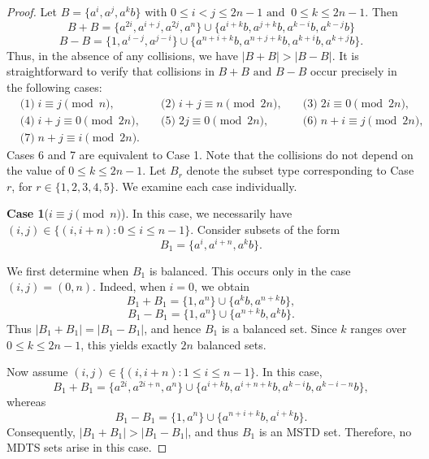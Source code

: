 \documentclass[10pt,a4paper]{amsart}
\begin{document}
\begin{proof}
Let $B=\{a^i,a^j,a^kb\}$ with $0\leq i<j\leq 2n-1 \text{ and }~0\leq k\leq 2n-1$. Then 
$$B+B=\{a^{2i},a^{i+j},a^{2j},a^n\}\cup\{a^{i+k}b,a^{j+k}b,a^{k-i}b,a^{k-j}b\}$$  
$$B-B=\{1,a^{i-j},a^{j-i}\}\cup \{a^{n+i+k}b,a^{n+j+k}b,a^{k+i}b,a^{k+j}b\}.$$ 
Thus, in the absence of any collisions, we have $|B+B|>|B-B|$.
It is straightforward to verify that collisions in $B+B \text{ and }B-B$ occur precisely in the following cases:
\begin{align*}
&\text{(1)}\; i \equiv j \pmod{n}, \quad
&\text{(2)}\; i+j \equiv n \pmod{2n}, \quad
&\text{(3)}\; 2i \equiv 0 \pmod{2n},\\
&\text{(4)}\; i+j \equiv 0 \pmod{2n}, \quad
&\text{(5)}\; 2j \equiv 0 \pmod{2n}, \quad
&\text{(6)}\; n+i \equiv j \pmod{2n},\\
&\text{(7)}\; n+j \equiv i \pmod{2n}.
\end{align*}
Cases 6 and 7 are equivalent to Case 1. Note that the collisions do not depend on the value of $0\leq k\leq 2n-1$. Let $B_{r}$ denote the subset type corresponding to Case $r$, for $r\in \{1,2,3,4,5\}$.   We examine each case individually.\par
\textbf{Case 1}($i \equiv j \pmod n$).
In this case, we necessarily have $(i,j)\in \{(i,i+n): 0\leq i\leq n-1\}$. Consider subsets of the form
$$B_1=\{a^{i},a^{i+n},a^{k}b\}.$$

We first determine when $B_1$ is balanced. This occurs only in the case $(i,j)=(0,n)$. Indeed, when $i=0$, we obtain
$$B_1+B_1=\{1,a^{n}\}\cup\{a^{k}b,a^{n+k}b\},$$
$$B_1-B_1=\{1,a^{n}\}\cup\{a^{n+k}b,a^{k}b\}.$$
Thus $|B_1+B_1|=|B_1-B_1|$, and hence $B_1$ is a balanced set. Since $k$ ranges over $0\le k\le 2n-1$, this yields exactly $2n$ balanced sets.

Now assume $(i,j)\in \{(i,i+n): 1\leq i\leq n-1\}$. In this case,
$$B_1+B_1=\{a^{2i},a^{2i+n},a^{n}\}\cup\{a^{i+k}b,a^{i+n+k}b,a^{k-i}b,a^{k-i-n}b\},$$
whereas
$$B_1-B_1=\{1,a^{n}\}\cup\{a^{n+i+k}b,a^{i+k}b\}.
$$
Consequently, $|B_1+B_1|>|B_1-B_1|$, and thus $B_1$ is an MSTD set. Therefore, no MDTS sets arise in this case.


\end{proof}
\end{document}
